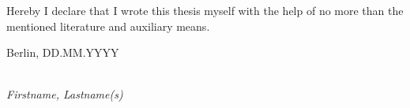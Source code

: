 \newpage

\thispagestyle{empty}

\begin{large}

\vspace*{6cm}

\noindent
Hereby I declare that I wrote this thesis myself with the help of no more than the mentioned literature and auxiliary means.
\vspace{2cm}

\noindent
Berlin, DD.MM.YYYY

\vspace{3cm}

\hspace*{7cm}%
\dotfill\\
\hspace*{8.2cm}%
\textit{Firstname, Lastname(s)}

\end{large}

